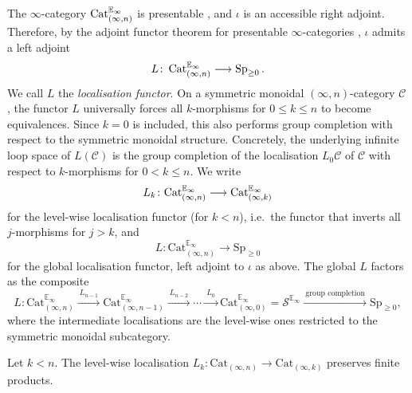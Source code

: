 \documentclass{amsart}
\begin{document}
The $\infty$-category $\operatorname{Cat}_{(\infty,n)}^{\mathbb{E}_\infty}$ is presentable \cite[Proposition~5.1.7 + Definition~5.3.6]{stefanich2020presentable}, and $\iota$ is an accessible right adjoint. Therefore, by the adjoint functor theorem for presentable $\infty$-categories \cite[Theorem~4.1.1]{nguyen2020adjoint}, $\iota$ admits a left adjoint
\[
L\colon \operatorname{Cat}_{(\infty,n)}^{\mathbb{E}_\infty} \longrightarrow \operatorname{Sp}_{\ge 0}.
\]
We call $L$ the \emph{localisation functor}. On a symmetric monoidal $(\infty,n)$-category $\mathcal{C}$, the functor $L$ universally forces all $k$-morphisms for $0 \le k \le n$ to become equivalences.
Since $k=0$ is included, this also performs group completion with respect to the symmetric monoidal structure. 
Concretely, the underlying infinite loop space of $L(\mathcal{C})$ is the group completion of the localisation $L_0 \mathcal{C}$ of $\mathcal{C}$ with respect to $k$-morphisms for $0 < k \leq n$. 
We write
\[
L_k \colon \mathrm{Cat}_{(\infty,n)}^{\mathbb{E}_\infty}  \longrightarrow \mathrm{Cat}_{(\infty,k)}^{\mathbb{E}_\infty} 
\]
for the level-wise localisation functor (for $k < n$), i.e.\ the functor that inverts all $j$-morphisms for $j > k$, and
\[
L \colon \mathrm{Cat}_{(\infty,n)}^{\mathbb{E}_\infty} \longrightarrow \mathrm{Sp}_{\geq 0}
\]
for the global localisation functor, left adjoint to $\iota$ as above. The global $L$ factors as the composite
\[
L \colon \mathrm{Cat}_{(\infty,n)}^{\mathbb{E}_\infty} \xrightarrow{\ L_{n-1}\ } \mathrm{Cat}_{(\infty,n-1)}^{\mathbb{E}_\infty} \xrightarrow{\ L_{n-2}\ } \cdots \xrightarrow{\ L_0\ } \mathrm{Cat}_{(\infty,0)}^{\mathbb{E}_\infty} = \mathcal{S}^{\mathbb{E}_\infty} \xrightarrow{\ \text{group completion}\ } \mathrm{Sp}_{\geq 0},
\]
where the intermediate localisations are the level-wise ones restricted to the symmetric monoidal subcategory.

\begin{lemma}
\label{lem:Lk-preserves-products}
Let $k < n$. The level-wise localisation $L_k \colon \mathrm{Cat}_{(\infty,n)} \to \mathrm{Cat}_{(\infty,k)}$ preserves finite products.
\end{lemma}
\end{document}
